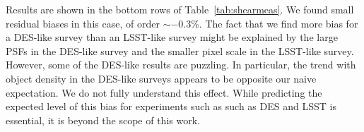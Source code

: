 \documentclass[iop, twocolappendix, appendixfloats, numberedappendix, apj]{hackemulateapj}
\newcommand{\mdet}{\textsc{metadetection}}
\begin{document}
%

Results are shown in the bottom rows of
Table~\ref{tab:shearmeas}. We found small residual biases in this case, of
order $\sim-0.3\%$. The fact that we find more bias for a DES-like survey than
an LSST-like survey might be explained by the large PSFs in the DES-like survey
and the smaller pixel scale in the LSST-like survey. However, some of the
DES-like results are puzzling. In particular, the trend with object density in
the DES-like surveys appears to be opposite our naive expectation. We do not
fully understand this effect. While predicting the expected level of this bias
for experiments such as such as DES and LSST is essential, it is beyond the
scope of this work.
\end{document}
